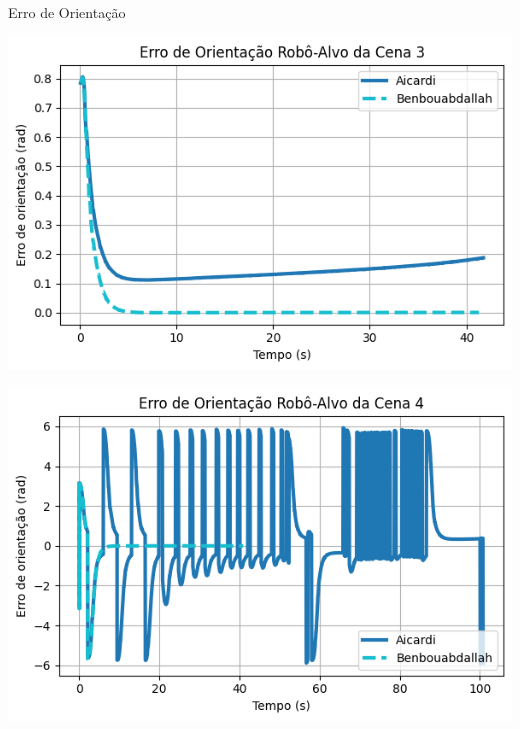 \documentclass{beamer}
\begin{document}
\begin{frame}{Erro de Orientação}
\begin{minipage}{0.48\linewidth}
    \centering
    \includegraphics[width=\linewidth]{Figuras/ErroOrientação_Cena_3.png}
  \end{minipage}
  \hfill
  \begin{minipage}{0.48\linewidth}
    \centering
    \includegraphics[width=\linewidth]{Figuras/ErroOrientação_Cena_4.png}
  \end{minipage}
\end{frame}
\end{document}
